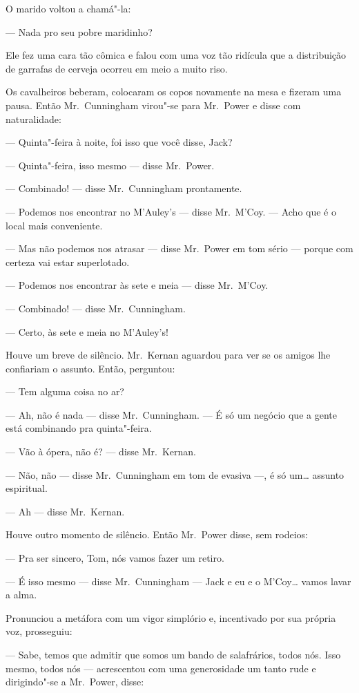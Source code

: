O marido voltou a chamá"-la:

--- Nada pro seu pobre maridinho?

Ele fez uma cara tão cômica e falou com uma voz tão ridícula que a distribuição
de garrafas de cerveja ocorreu em meio a muito riso.

Os cavalheiros beberam, colocaram os copos novamente na mesa e fizeram uma
pausa.  Então Mr.~Cunningham virou"-se para Mr.~Power e disse com naturalidade:

--- Quinta"-feira à noite, foi isso que você disse, Jack?

--- Quinta"-feira, isso mesmo --- disse Mr.~Power.

--- Combinado! --- disse Mr.~Cunningham prontamente.

--- Podemos nos encontrar no M’Auley’s --- disse Mr.~M’Coy.  --- Acho que é o
local mais conveniente.

--- Mas não podemos nos atrasar --- disse Mr.~Power em tom sério --- porque com
certeza vai estar superlotado.

--- Podemos nos encontrar às sete e meia --- disse Mr.~M’Coy.

--- Combinado! --- disse Mr.~Cunningham.

--- Certo, às sete e meia no M’Auley’s!

Houve um breve de silêncio.  Mr.~Kernan aguardou para ver se os amigos lhe
confiariam o assunto.  Então, perguntou:

--- Tem alguma coisa no ar?

--- Ah, não é nada --- disse Mr.~Cunningham.  --- É só um negócio que a gente
está combinando pra quinta"-feira.

--- Vão à ópera, não é? --- disse Mr.~Kernan.

--- Não, não --- disse Mr.~Cunningham em tom de evasiva ---, é só um\ldots{}
assunto espiritual.

--- Ah --- disse Mr.~Kernan.

Houve outro momento de silêncio.  Então Mr.~Power disse, sem rodeios:

--- Pra ser sincero, Tom, nós vamos fazer um retiro.

--- É isso mesmo --- disse Mr.~Cunningham --- Jack e eu e o M’Coy\ldots{} vamos
lavar a alma.

Pronunciou a metáfora com um vigor simplório e, incentivado por sua própria
voz, prosseguiu:

--- Sabe, temos que admitir que somos um bando de salafrários, todos nós.  Isso
mesmo, todos nós --- acrescentou com uma generosidade um tanto rude e
dirigindo"-se a Mr.~Power, disse:

